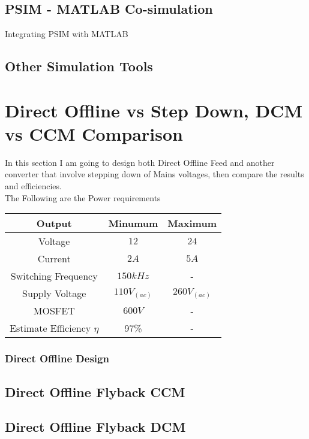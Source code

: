 \documentclass{article}
\begin{document}
\subsection[Getting the Full Power of Both MATLAB and PSIM - Cosimulation]{PSIM - MATLAB Co-simulation}
Integrating PSIM with MATLAB

\subsection[Other Simulation Tools]{Other Simulation Tools}

\section[Comparison]{Direct Offline vs Step Down, DCM vs CCM Comparison}
In this section I am going to design both Direct Offline Feed and another converter that involve stepping down of Mains voltages, then compare the results and efficiencies.
\\
The Following are the Power requirements\\\begin{tabular}{|c|c|c|}
    \hline
    Output  & Minumum & Maximum \\ \hline
    Voltage & $12$     & $24$ \\ \hline
    Current & $2A$ & $5A$ \\ \hline
    Switching Frequency & $150kHz$ & -\\   \hline
    Supply Voltage & $110 V_(ac) $ & $260 V_(ac) $ \\ \hline
    MOSFET & $600 V$ & - \\ \hline
    Estimate Efficiency $\eta$ & 97\% & - \\ \hline
    
\end{tabular}

\subsubsection[Direct Offline Flyback Converter Design]{Direct Offline Design}
\subsection[Direct Offline Flyback CCM]{Direct Offline Flyback CCM}
\subsection[Direct Offline Flyback DCM]{Direct Offline Flyback DCM}
\end{document}

